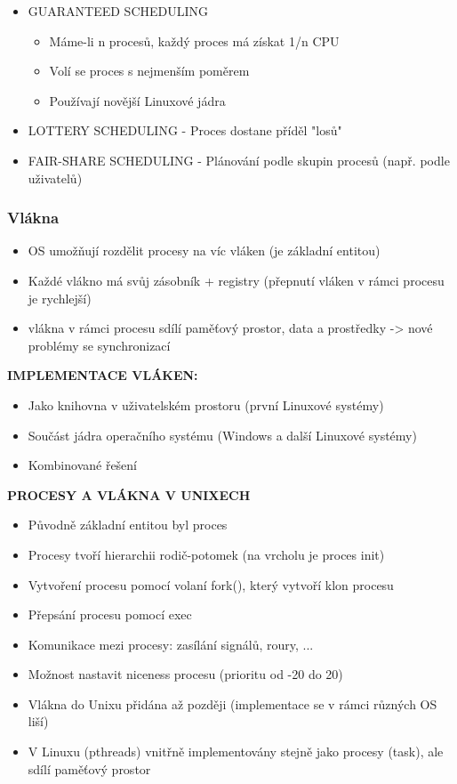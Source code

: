 \documentclass[10pt,a4paper]{article}
\begin{document}
\begin{itemize}
	\item GUARANTEED SCHEDULING
	\begin{itemize}
		\item Máme-li n procesů, každý proces má získat 1/n CPU
		\item Volí se proces s nejmenším poměrem
		\item Používají novější Linuxové jádra
	\end{itemize}
	\item LOTTERY SCHEDULING - Proces dostane příděl "losů"
	\item FAIR-SHARE SCHEDULING - Plánování podle skupin procesů (např. podle uživatelů)
\end{itemize}

\subsubsection{Vlákna}
\begin{itemize}
	\item OS umožňují rozdělit procesy na víc vláken (je základní entitou)
	\item Každé vlákno má svůj zásobník + registry (přepnutí vláken v rámci procesu je rychlejší)
	\item vlákna v rámci procesu sdílí paměťový prostor, data a prostředky -> nové problémy se synchronizací 
\end{itemize}

\textbf{IMPLEMENTACE VLÁKEN:}
\begin{itemize}
	\item Jako knihovna v uživatelském prostoru (první Linuxové systémy)
	\item Součást jádra operačního systému (Windows a další Linuxové systémy)
	\item Kombinované řešení
\end{itemize}

\textbf{PROCESY A VLÁKNA V UNIXECH}
\begin{itemize}
	\item Původně základní entitou byl proces
	\item Procesy tvoří hierarchii rodič-potomek (na vrcholu je proces init)
	\item Vytvoření procesu pomocí volaní fork(), který vytvoří klon procesu
	\item Přepsání procesu pomocí exec
	\item Komunikace mezi procesy: zasílání signálů, roury, ...
	\item Možnost nastavit niceness procesu (prioritu od -20 do 20)
	\item Vlákna do Unixu přidána až později (implementace se v rámci různých OS liší)
	\item V Linuxu (pthreads) vnitřně implementovány stejně jako procesy (task), ale sdílí paměťový prostor
\end{itemize}
\end{document}
